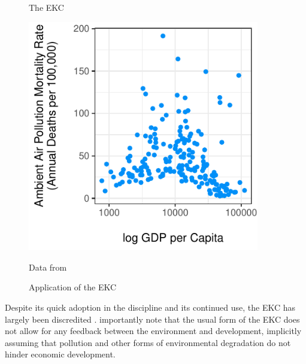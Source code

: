 \begin{figure}
\centering
\begin{minipage}{0.48 \textwidth}
\caption{The EKC \label{EKC}}
\end{minipage}
\begin{minipage}{0.48\textwidth}
\centering 
\caption{Application of the  EKC}
\includegraphics[width=0.9\textwidth]{figures/chapter2_figures/ekc.pdf}
\end{minipage}
Data from \cite{owidoutdoorairpollution} 
\end{figure}

Despite its quick adoption in the discipline and its continued use, the EKC has largely been discredited \citep{stern2004rise}. \cite{arrow1995economic} importantly note that the usual form of the EKC does not allow for any feedback between the environment and development, implicitly assuming that pollution and other forms of environmental degradation do not hinder economic development. 

